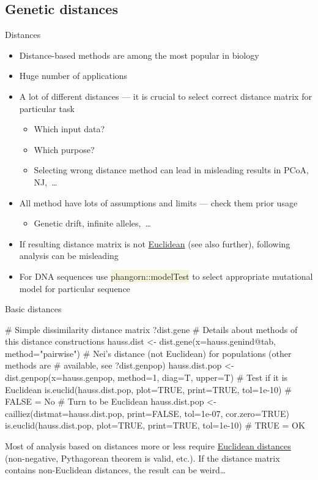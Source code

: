 \documentclass[compress, xelatex, 11pt, xcolor=svgnames, aspectratio=169,
	hyperref={
		bookmarks=true,
		unicode=true,
		colorlinks=true,
		pdftitle={Molecular data in R},
		plainpages=false,
		pdfauthor={Vojtech Zeisek},
		pdfsubject={Course about phylogeny and evolution in R},
		pdfcreator={XeLaTeX},
		pdfkeywords={R, evolution, phylogeny, molecular data},
		linkcolor=Crimson, %
		anchorcolor=Magenta, %
		citecolor=Magenta, %
		filecolor=Magenta, %
		menucolor=Magenta, %
		urlcolor=DodgerBlue, %
		},
	url={hyphens, lowtilde} %
	]{beamer}
\renewcommand{\texttt}[1]{\colorbox{Beige}{{\ttfamily #1}}}
\begin{document}
\subsection{Genetic distances}

\begin{frame}[fragile]{Distances}
	\label{distances}
	\begin{itemize}
		\item Distance-based methods are among the most popular in biology
		\item Huge number of applications
		\item A lot of different distances --- it is crucial to select correct distance matrix for particular task
		\begin{itemize}
			\item Which input data?
			\item Which purpose?
			\item Selecting wrong distance method can lead in misleading results in PCoA, NJ,~\ldots
		\end{itemize}
		\item All method have lots of assumptions and limits --- check them prior usage
		\begin{itemize}
			\item Genetic drift, infinite alleles,~\ldots
		\end{itemize}
		\item If resulting distance matrix is not \href{https://en.wikipedia.org/wiki/Euclidean_distance_matrix}{Euclidean} (see also further), following analysis can be misleading
		\item For DNA sequences use \texttt{phangorn::modelTest} to select appropriate mutational model for particular sequence
	\end{itemize}
\end{frame}

\begin{frame}[fragile]{Basic distances}
	\begin{spluscode}
    # Simple dissimilarity distance matrix
    ?dist.gene # Details about methods of this distance constructions
    hauss.dist <- dist.gene(x=hauss.genind@tab, method="pairwise")
    # Nei's distance (not Euclidean) for populations (other methods are
    # available, see ?dist.genpop)
    hauss.dist.pop <- dist.genpop(x=hauss.genpop, method=1, diag=T, upper=T)
    # Test if it is Euclidean
    is.euclid(hauss.dist.pop, plot=TRUE, print=TRUE, tol=1e-10) # FALSE = No
    # Turn to be Euclidean
    hauss.dist.pop <- cailliez(distmat=hauss.dist.pop, print=FALSE, tol=1e-07,
      cor.zero=TRUE)
    is.euclid(hauss.dist.pop, plot=TRUE, print=TRUE, tol=1e-10) # TRUE = OK
	\end{spluscode}
	\vfil
	Most of analysis based on distances more or less require \href{https://en.wikipedia.org/wiki/Euclidean_distance_matrix}{Euclidean distances} (non-negative, Pythagorean theorem is valid, etc.). If the distance matrix contains non-Euclidean distances, the result can be weird\ldots
	\vfill
\end{frame}
\end{document}
